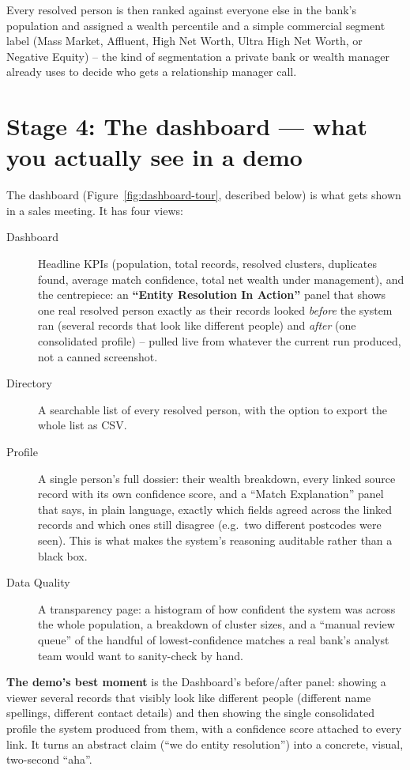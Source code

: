 \documentclass[11pt]{report}
\begin{document}
Every resolved person is then ranked against everyone else in the bank's population and assigned a wealth percentile and a simple commercial segment label (Mass Market, Affluent, High Net Worth, Ultra High Net Worth, or Negative Equity) -- the kind of segmentation a private bank or wealth manager already uses to decide who gets a relationship manager call.

\section{Stage 4: The dashboard --- what you actually see in a demo}

The dashboard (Figure~\ref{fig:dashboard-tour}, described below) is what gets shown in a sales meeting. It has four views:

\begin{description}
\item[Dashboard] Headline KPIs (population, total records, resolved clusters, duplicates found, average match confidence, total net wealth under management), and the centrepiece: an \textbf{``Entity Resolution In Action''} panel that shows one real resolved person exactly as their records looked \emph{before} the system ran (several records that look like different people) and \emph{after} (one consolidated profile) -- pulled live from whatever the current run produced, not a canned screenshot.
\item[Directory] A searchable list of every resolved person, with the option to export the whole list as CSV.
\item[Profile] A single person's full dossier: their wealth breakdown, every linked source record with its own confidence score, and a ``Match Explanation'' panel that says, in plain language, exactly which fields agreed across the linked records and which ones still disagree (e.g.\ two different postcodes were seen). This is what makes the system's reasoning auditable rather than a black box.
\item[Data Quality] A transparency page: a histogram of how confident the system was across the whole population, a breakdown of cluster sizes, and a ``manual review queue'' of the handful of lowest-confidence matches a real bank's analyst team would want to sanity-check by hand.
\end{description}

\begin{bizbox}
\textbf{The demo's best moment} is the Dashboard's before/after panel: showing a viewer several records that visibly look like different people (different name spellings, different contact details) and then showing the single consolidated profile the system produced from them, with a confidence score attached to every link. It turns an abstract claim (``we do entity resolution'') into a concrete, visual, two-second ``aha''.
\end{bizbox}
\end{document}
